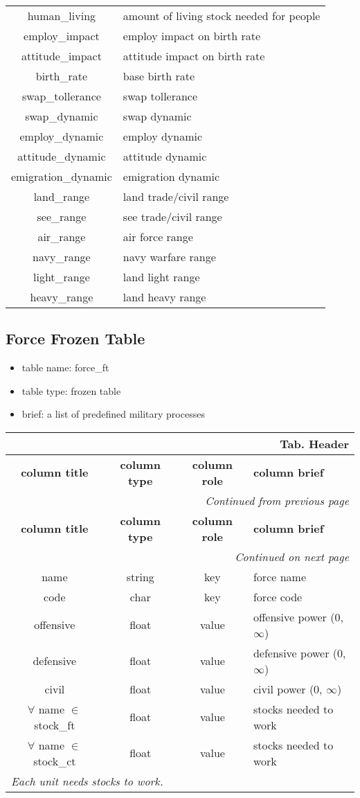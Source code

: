 \documentclass[a4paper,oneside,titlepage]{report}
\newcommand*{\LTHeaderIV}[5]{
  \multicolumn{4}{r}{\textbf{Tab. \thesubsection} \textbf{#1}}\\    
  \hline
  \textbf{#2} & \textbf{#3} & \textbf{#4} & \textbf{#5}\\
  \hline
  
  \endfirsthead
  \multicolumn{4}{r}{\textit{Continued from previous page}}\\    
  \hline
  \textbf{#2} & \textbf{#3} & \textbf{#4} & \textbf{#5}\\
  \hline
  \endhead
  \hline
  \multicolumn{4}{r}{\textit{Continued on next page}}\\
  \endfoot
  \hline
  \endlastfoot  
}
\begin{document}
\begin{longtable}{ |c|l| }
    human\_living & amount of living stock needed for people\\      
    employ\_impact & employ impact on birth rate\\ 
    attitude\_impact & attitude impact on birth rate\\ 
    birth\_rate & base birth rate\\ 
    \hline
    swap\_tollerance & swap tollerance\\ 
    swap\_dynamic & swap dynamic\\ 
    \hline
    employ\_dynamic & employ dynamic\\ 
    attitude\_dynamic & attitude dynamic\\ 
    emigration\_dynamic & emigration dynamic\\ 
    \hline
    land\_range & land trade$/$civil range\\      
    see\_range & see trade$/$civil range\\
    \hline
    air\_range & air force range\\
    navy\_range & navy warfare range\\
    light\_range & land light range\\
    heavy\_range & land heavy range\\
  \end{longtable}
 
\subsection{Force Frozen Table}
\begin{itemize}
  \setlength{\itemsep}{0pt}
  \setlength{\parskip}{0pt}
\item table name: force\_ft  
\item table type: frozen table   
\item brief: a list of predefined military processes
\end{itemize}
\label{force_ft}

\vspace{-0.5cm}
\begin{longtable}{ |c|c|c|l| } 
  \LTHeaderIV{Header}{column title}{column type}{column role}{column brief}
  name & string & key & force name\\
  code & char & key & force code\\
  offensive & float & value & offensive power (0, $\infty$)\\
  defensive & float & value & defensive power (0, $\infty$)\\
  civil & float & value & civil power (0, $\infty$)\\
  $\forall$ name $\in$ stock\_ft & float & value & stocks needed to work\\
  $\forall$ name $\in$ stock\_ct & float & value & stocks needed to work\\
  \multicolumn{4}{|l|}{\textit{Each unit needs stocks to work.}}\\  
\end{longtable}        
\end{document}
